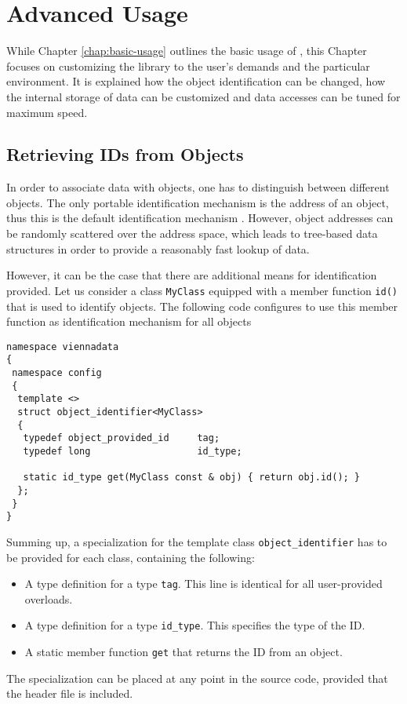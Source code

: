 \chapter{Advanced Usage} \label{chap:advanced-usage}

While Chapter \ref{chap:basic-usage} outlines the basic usage of {\ViennaData}, this Chapter focuses
on customizing the library to the user's demands and the particular environment. It is explained how
the object identification can be changed, how the internal storage of data can be customized and data
accesses can be tuned for maximum speed.

\section{Retrieving IDs from Objects} \label{sec:id-retrieval}
In order to associate data with objects, one has to distinguish between different objects. The only portable identification mechanism
is the address of an object, thus this is the default identification mechanism {\ViennaData}.
However, object addresses can be randomly scattered over the address space, which leads to tree-based data structures in order to
provide a reasonably fast lookup of data.

However, it can be the case that there are additional means for identification provided.
Let us consider a class \lstinline|MyClass| equipped with a member function \lstinline|id()| that
is used to identify objects. The following code configures {\ViennaData} to use this member function
as identification mechanism for all objects
\begin{lstlisting}
namespace viennadata
{
 namespace config
 {
  template <>
  struct object_identifier<MyClass>
  {
   typedef object_provided_id     tag;
   typedef long                   id_type;

   static id_type get(MyClass const & obj) { return obj.id(); }
  };
 }
}
\end{lstlisting}
Summing up, a specialization for the template class \lstinline|object_identifier| has to be provided
for each class, containing the following:
\begin{itemize}
 \item A type definition for a type \lstinline|tag|. This line is identical for all user-provided overloads.
 \item A type definition for a type \lstinline|id_type|. This specifies the type of the ID.
 \item A static member function \lstinline|get| that returns the ID from an object.
\end{itemize}
The specialization can be placed at any point in the source code, provided that the {\ViennaData} header file is included.

